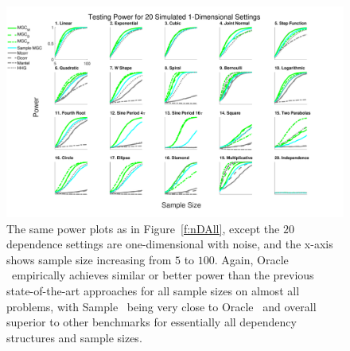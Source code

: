 \documentclass[11pt]{article}
\begin{document}
\begin{figure}[htbp]
\includegraphics[width=1.0\textwidth,trim={0 0.5cm 3.2cm 0},clip]{Figures/Fig1DPowerAll}
\caption{
The same power plots as in Figure~\ref{f:nDAll}, except the $20$ dependence settings are one-dimensional with noise, and the x-axis shows sample size increasing from $5$ to $100$. 
Again, Oracle \Mgc~empirically achieves similar or better power than the previous state-of-the-art approaches for all sample sizes on almost all problems, with Sample \Mgc~being very close to Oracle \Mgc~and overall superior to other benchmarks for essentially all dependency structures and sample sizes.}
\label{f:1DAll}
\end{figure}


\end{document}
